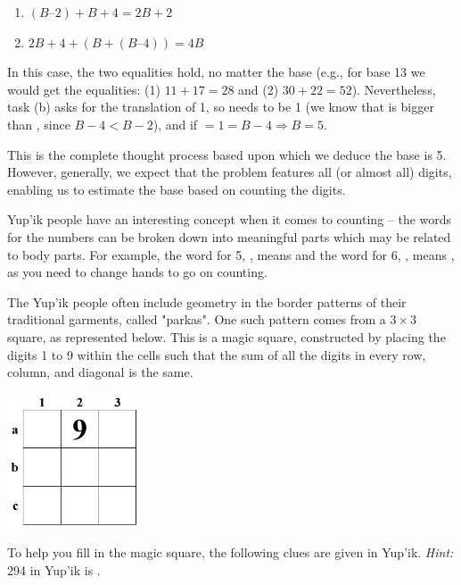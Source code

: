 \begin{refsection}
\begin{discussion}
\begin{enumerate}[leftmargin = 5em, label = (\arabic*)]
    \item $(B–2) + B + 4 = 2B + 2$
    \item $2B + 4 + (B + (B–4)) = 4B$
\end{enumerate}

 In this case, the two equalities hold, no matter the base (e.g., for base 13 we would get the equalities: (1) $11 + 17 = 28$ and (2) $30 + 22 = 52$). Nevertheless, task (b) asks for the translation of 1, so  needs to be 1 (we know that  is bigger than , since $B-4 < B-2$), and if  $= 1 = B-4 \Rightarrow B = 5$.

This is the complete thought process based upon which we deduce the base is 5. However, generally, we expect that the problem features all (or almost all) digits, enabling us to estimate the base based on counting the digits.
\end{discussion}

\begin{problem}{\langnameYupik}{\nameKLow}{}
Yup'ik people have an interesting concept when it comes to counting – the words for the numbers can be broken down into meaningful parts which may be related to body parts. For example, the word for 5, , means  and the word for 6, , means , as you need to change hands to go on counting. 

The Yup'ik people often include geometry in the border patterns of their traditional garments, called "parkas". One such pattern comes from a $3\times3$ square, as represented below. This is a magic square, constructed by placing the digits 1 to 9 within the cells such that the sum of all the digits in every row, column, and diagonal is the same.
\begin{center}
\includegraphics[width = 4cm]{images/Yupik_square.jpg}
\end{center}

To help you fill in the magic square, the following clues are given in Yup'ik.
\textit{Hint:} 294 in Yup'ik is .


\end{problem}
\end{refsection}
